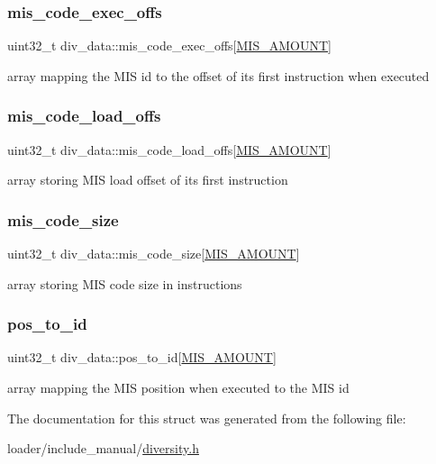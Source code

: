 \subsubsection{\texorpdfstring{mis\+\_\+code\+\_\+exec\+\_\+offs}{mis\_code\_exec\_offs}}
{\footnotesize\ttfamily uint32\+\_\+t div\+\_\+data\+::mis\+\_\+code\+\_\+exec\+\_\+offs\mbox{[}\hyperlink{div__data_8h_a3132ecd423d2111501409d7956aae527}{M\+I\+S\+\_\+\+A\+M\+O\+U\+NT}\mbox{]}}

array mapping the M\+IS id to the offset of its first instruction when executed \mbox{\label{structdiv__data_a925a744075f14451053bde1984307c2c}} 
\subsubsection{\texorpdfstring{mis\+\_\+code\+\_\+load\+\_\+offs}{mis\_code\_load\_offs}}
{\footnotesize\ttfamily uint32\+\_\+t div\+\_\+data\+::mis\+\_\+code\+\_\+load\+\_\+offs\mbox{[}\hyperlink{div__data_8h_a3132ecd423d2111501409d7956aae527}{M\+I\+S\+\_\+\+A\+M\+O\+U\+NT}\mbox{]}}

array storing M\+IS load offset of its first instruction \mbox{\label{structdiv__data_a10a5d55d28a5659701b4d1df3660f693}} 
\subsubsection{\texorpdfstring{mis\+\_\+code\+\_\+size}{mis\_code\_size}}
{\footnotesize\ttfamily uint32\+\_\+t div\+\_\+data\+::mis\+\_\+code\+\_\+size\mbox{[}\hyperlink{div__data_8h_a3132ecd423d2111501409d7956aae527}{M\+I\+S\+\_\+\+A\+M\+O\+U\+NT}\mbox{]}}

array storing M\+IS code size in instructions \mbox{\label{structdiv__data_a33056572ecaf33c72d4400f33249193d}} 
\subsubsection{\texorpdfstring{pos\+\_\+to\+\_\+id}{pos\_to\_id}}
{\footnotesize\ttfamily uint32\+\_\+t div\+\_\+data\+::pos\+\_\+to\+\_\+id\mbox{[}\hyperlink{div__data_8h_a3132ecd423d2111501409d7956aae527}{M\+I\+S\+\_\+\+A\+M\+O\+U\+NT}\mbox{]}}

array mapping the M\+IS position when executed to the M\+IS id 

The documentation for this struct was generated from the following file\+:\begin{DoxyCompactItemize}
\item 
loader/include\+\_\+manual/\hyperlink{diversity_8h}{diversity.\+h}\end{DoxyCompactItemize}
